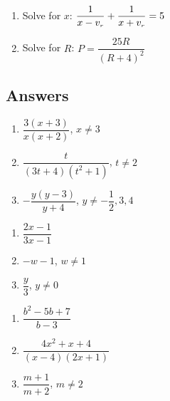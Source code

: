 \documentclass{ximera}
\begin{document}
\begin{multicols}{2}
\begin{enumerate}
\setcounter{enumi}{\value{HW}}


\item  Solve for $x$:  $\dfrac{1}{x - v_{\text{\tiny $r$}}} + \dfrac{1}{x + v_{\text{\tiny $r$}}} = 5$

\item Solve for $R$:  $P = \dfrac{25R}{(R+4)^2}$ \label{litrateqnlast}

\setcounter{HW}{\value{enumi}}
\end{enumerate}
\end{multicols}

\newpage

\subsection{Answers}

\begin{multicols}{3}
\begin{enumerate}

\item $\dfrac{3(x+3)}{x(x+2)}$, $x \neq 3$
\item $\dfrac{t}{(3t+4)(t^2+1)}$, $t \neq 2$
\item $-\dfrac{y(y-3)}{y+4}$, $y \neq -\dfrac{1}{2}, 3, 4$ 

\setcounter{HW}{\value{enumi}}
\end{enumerate}
\end{multicols}

\begin{multicols}{3}
\begin{enumerate}
\setcounter{enumi}{\value{HW}}

\item  $\dfrac{2x-1}{3x-1}$
\item  $-w-1$, $w \neq 1$
\item  $\dfrac{y}{3}$, $y \neq 0$
 

\setcounter{HW}{\value{enumi}}
\end{enumerate}
\end{multicols}

\begin{multicols}{3}
\begin{enumerate}
\setcounter{enumi}{\value{HW}}

\item  $\dfrac{b^2-5b+7}{b-3}$
\item  $\dfrac{4x^2+x+4}{(x-4)(2x+1)}$
\item  $\dfrac{m+1}{m+2}$, $m \neq 2$

\setcounter{HW}{\value{enumi}}
\end{enumerate}
\end{multicols}
\end{document}
